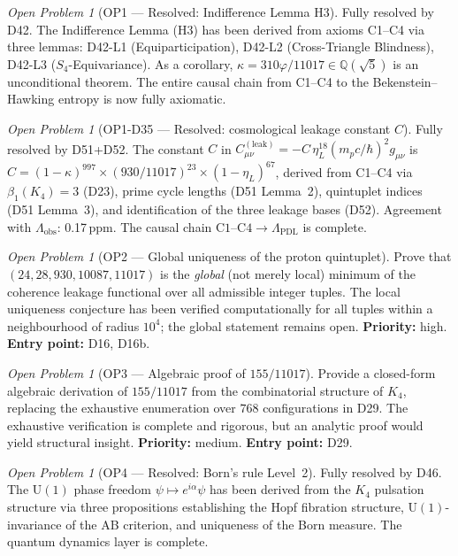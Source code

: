 \documentclass[11pt,a4paper]{article}
\theoremstyle{plain}
\theoremstyle{definition}
\theoremstyle{remark}
\newtheorem{openproblem}[theorem]{Open Problem}
\begin{document}
\begin{openproblem}[OP1 --- Resolved: Indifference Lemma H3]
\label{op:H3}
\textcolor{proofblue}{Fully resolved by D42.} The Indifference Lemma (H3) has been derived from axioms C1--C4 via three lemmas: D42-L1 (Equiparticipation), D42-L2 (Cross-Triangle Blindness), D42-L3 ($S_4$-Equivariance). As a corollary, $\kappa=310\varphi/11017\in\mathbb{Q}(\sqrt{5})$ is an unconditional theorem. The entire causal chain from C1--C4 to the Bekenstein--Hawking entropy is now fully axiomatic.
\end{openproblem}

\begin{openproblem}[OP1-D35 --- Resolved: cosmological leakage constant $C$]
\label{op:leakconstant}
\textcolor{proofblue}{Fully resolved by D51+D52.} The constant $C$ in $C^{(\mathrm{leak})}_{\mu\nu}=-C\,\eta_L^{18}(m_p c/\hbar)^2 g_{\mu\nu}$ is $C=(1-\kappa)^{997}\times(930/11017)^{23}\times(1-\eta_L)^{67}$, derived from C1--C4 via $\beta_1(K_4)=3$ (D23), prime cycle lengths (D51 Lemma~2), quintuplet indices (D51 Lemma~3), and identification of the three leakage bases (D52). Agreement with $\Lambda_{\mathrm{obs}}$: 0.17\,ppm. The causal chain $\mathrm{C1\text{--}C4}\to\Lambda_{\mathrm{PDL}}$ is complete.
\end{openproblem}

\begin{openproblem}[OP2 --- Global uniqueness of the proton quintuplet]
\label{op:uniqueness}
Prove that $(24, 28, 930, 10087, 11017)$ is the \emph{global} (not merely local) minimum of the coherence leakage functional over all admissible integer tuples. The local uniqueness conjecture has been verified computationally for all tuples within a neighbourhood of radius $10^4$; the global statement remains open. \textbf{Priority:} high. \textbf{Entry point:} D16, D16b.
\end{openproblem}

\begin{openproblem}[OP3 --- Algebraic proof of $155/11017$]
\label{op:gate1algebraic}
Provide a closed-form algebraic derivation of $155/11017$ from the combinatorial structure of $K_4$, replacing the exhaustive enumeration over $768$ configurations in D29. The exhaustive verification is complete and rigorous, but an analytic proof would yield structural insight. \textbf{Priority:} medium. \textbf{Entry point:} D29.
\end{openproblem}

\begin{openproblem}[OP4 --- Resolved: Born's rule Level~2]
\label{op:bornlevel2}
\textcolor{proofblue}{Fully resolved by D46.} The $\mathrm{U}(1)$ phase freedom $\psi \mapsto e^{i\alpha}\psi$ has been derived from the $K_4$ pulsation structure via three propositions establishing the Hopf fibration structure, $\mathrm{U}(1)$-invariance of the AB criterion, and uniqueness of the Born measure. The quantum dynamics layer is complete.
\end{openproblem}
\end{document}
